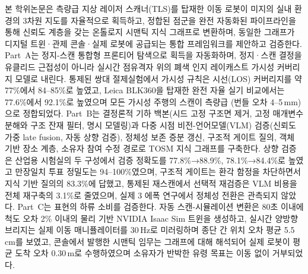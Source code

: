 \documentclass[11pt,a4paper]{skkuthesis}
\begin{document}
\mainmatterstyle





\begin{koreanabstract}
본 학위논문은 측량급 지상 레이저 스캐너(TLS)를 탑재한 이동 로봇이 미지의 실내
환경의 3차원 지도를 자율적으로 획득하고, 정합된 점군을 완전 자동화된 파이프라인을
통해 신뢰도 계층을 갖는 온톨로지 시맨틱 지식 그래프로 변환하며, 동일한 그래프가
디지털 트윈·관제 콘솔·실제 로봇에 공급되는 통합 프레임워크를 제안하고 검증한다.
Part~A는 정지-스캔 통합형 프론티어 탐색으로 획득을 자동화하며, 정지·스캔 결정을
유클리드 근접성이 아니라 실시간 점유격자 위의 폐색 인지 레이캐스트 가시성
커버리지 모델로 내린다. 통제된 쌍대 절제실험에서 가시성 규칙은 시선(LOS)
커버리지를 약 77\%에서 84--85\%로 높였고, Leica BLK360을 탑재한 완전 자율
실기 비교에서는 77.6\%에서 92.1\%로 높였으며 모든 가시성 주행의 스캔이 측량급
(번들 오차 4--5\,mm)으로 정합되었다. Part~B는 결정론적 기하 백본(시드 고정 구조면
제거, 고정 매개변수 분해와 구조 잔재 필터, 명시 모델링)과 다중 시점
비전-언어모델(VLM) 검증(신뢰도 가중 late fusion, 자동 상향 검증), 정체성 보존
증분 갱신, 구조적 게이트 질의, 객체 기반 장소 계층, 소유자 참여 수정 경로로
TOSM 지식 그래프를 구축한다. 상향 검증은 산업용 시험실의 두 구성에서 검증 정확도를
77.8\%→88.9\%, 78.1\%→84.4\%로 높였고 만장일치 투표 정밀도는 94--100\%였으며,
구조적 게이트는 환각 함정을 차단하면서 지식 기반 질의의 83.3\%에 답했고, 통제된
재스캔에서 선택적 재검증은 VLM 비용을 전체 재구축의 3.1\%로 줄였으며, 실제 3
에폭 연구에서 정체성 전환은 관측되지 않았다. Part~C는 표현의 하류 소비를 검증한다.
자동 스캔-시뮬레이션 변환은 80초 이내에 척도 오차 2\% 이내의 물리 기반 NVIDIA
Isaac Sim 트윈을 생성하고, 실시간 양방향 브리지는 실제 이동 매니퓰레이터를 30\,Hz로
미러링하며 종단 간 위치 오차 평균 5.5\,cm를 보였고, 콘솔에서 발행한 시맨틱 임무는
그래프에 대해 해석되어 실제 로봇이 평균 도착 오차 0.30\,m로 수행하였으며 소유자가
반박한 유령 목표는 이동 없이 거부되었다.
\end{koreanabstract}

\makesidecover
\end{document}
